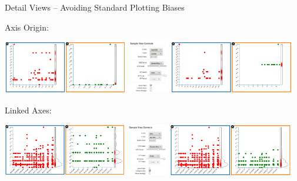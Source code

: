 \documentclass{beamer}
\begin{document}
\begin{frame}{Detail Views -- Avoiding Standard Plotting Biases}

  \begin{block}{Axis Origin:}

  \centerline{
  \includegraphics[height=2.35cm]{./img/fview_origin_pre.png}
  \includegraphics[height=2.35cm]{./img/fview_ctrls_origin.png}
  \includegraphics[height=2.35cm]{./img/fview_origin_post.png}
  }

  \end{block}

  \begin{block}{Linked Axes:}

  \centerline{
  \includegraphics[height=2.35cm]{./img/fview_link_pre.png}
  \includegraphics[height=2.35cm]{./img/fview_ctrls_link.png}
  \includegraphics[height=2.35cm]{./img/fview_link_post.png}
  }
  
  \end{block}

\end{frame}
\end{document}
